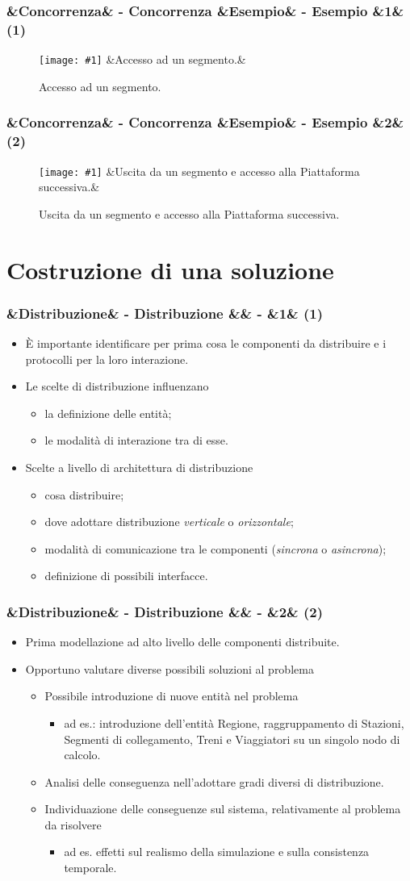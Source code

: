 \documentclass[slidestop,compress,blackandwhite]{beamer}
\newcommand{\ii}[1]{\textit{#1}}
\newcommand{\cm}[1]{\vspace{#1cm}}
\newcommand{\newtitle}[4]{
	#1 
	\ifx&#2&%
	\else
  		\large- #2
	\fi
	\ifx&#3&%
	\else
  		\normalsize- #3
	\fi
	\ifx&#4&%
	\else
  		\normalsize (#4)
	\fi
}
\newcommand{\newframe}[5]{
	\begin{frame}
		\frametitle{\newtitle{#1}{#2}{#3}{#4}}
		#5
	\end{frame}
}
\newcommand{\myitemize}[1]{
	\begin{itemize}\itemsep4pt
	#1
	\end{itemize}
}
\newcommand{\newfigure}[3]{
	\begin{figure}
		\centering
		\texttt{[image: \#1]}
		\ifx&#3&%
		\else
	  		\caption{\scriptsize #3}
		\fi
	\end{figure}
}
\begin{document}
	\newframe{}{Concorrenza}{Esempio}{1}{
		\newfigure{imgs/ingresso_segmento}{0.5}{Accesso ad un segmento.}
	}
	
	\newframe{}{Concorrenza}{Esempio}{2}{
		\newfigure{imgs/ingresso_stazione}{0.5}{Uscita da un segmento e accesso alla Piattaforma successiva.}
	}
	
	
	
\section{Costruzione di una soluzione}\label{sol}

	\newframe{}{Distribuzione}{}{1}{
		\myitemize {
			\item \`E importante identificare per prima cosa le componenti da distribuire e i protocolli per la loro interazione. 
			\item Le scelte di distribuzione influenzano\\
				\myitemize {
					\item la definizione delle entità;\\
				 	\item le modalità di interazione tra di esse.
				}
			
			\item Scelte a livello di architettura di distribuzione
				\myitemize{
					\item cosa distribuire;
					\item dove adottare distribuzione \ii{verticale} o \ii{orizzontale};
					\item modalità di comunicazione tra le componenti (\ii{sincrona} o \ii{asincrona});
					\item definizione di possibili interfacce.		
				}
		}
	}


	\newframe{}{Distribuzione}{}{2}{

		\myitemize {
			\item Prima modellazione ad alto livello delle componenti distribuite.
			\cm{0.2}
			\item Opportuno valutare diverse possibili soluzioni al problema
				\myitemize {
					\item Possibile introduzione di nuove entità nel problema
					\myitemize {
						\item ad es.: introduzione dell'entità Regione, raggruppamento di Stazioni, Segmenti di collegamento, Treni e Viaggiatori su un singolo nodo di calcolo.
					}
					\item Analisi delle conseguenza nell'adottare gradi diversi di distribuzione.
					\item Individuazione delle conseguenze sul sistema, relativamente al problema da risolvere
					\myitemize {
						\item ad es. effetti sul realismo della simulazione e sulla consistenza temporale.
					}
				}
			
			
		}
	}
\end{document}
